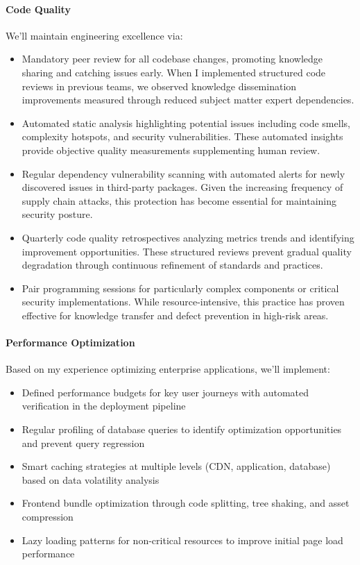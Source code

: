 \documentclass[12pt,a4paper]{article}
\begin{document}
\paragraph{Code Quality}
We'll maintain engineering excellence via:
\begin{itemize}
    \item Mandatory peer review for all codebase changes, promoting knowledge sharing and catching issues early. When I implemented structured code reviews in previous teams, we observed knowledge dissemination improvements measured through reduced subject matter expert dependencies.
    \item Automated static analysis highlighting potential issues including code smells, complexity hotspots, and security vulnerabilities. These automated insights provide objective quality measurements supplementing human review.
    \item Regular dependency vulnerability scanning with automated alerts for newly discovered issues in third-party packages. Given the increasing frequency of supply chain attacks, this protection has become essential for maintaining security posture.
    \item Quarterly code quality retrospectives analyzing metrics trends and identifying improvement opportunities. These structured reviews prevent gradual quality degradation through continuous refinement of standards and practices.
    \item Pair programming sessions for particularly complex components or critical security implementations. While resource-intensive, this practice has proven effective for knowledge transfer and defect prevention in high-risk areas.
\end{itemize}

\paragraph{Performance Optimization}
Based on my experience optimizing enterprise applications, we'll implement:
\begin{itemize}
    \item Defined performance budgets for key user journeys with automated verification in the deployment pipeline
    \item Regular profiling of database queries to identify optimization opportunities and prevent query regression
    \item Smart caching strategies at multiple levels (CDN, application, database) based on data volatility analysis
    \item Frontend bundle optimization through code splitting, tree shaking, and asset compression
    \item Lazy loading patterns for non-critical resources to improve initial page load performance
\end{itemize}
\end{document}
